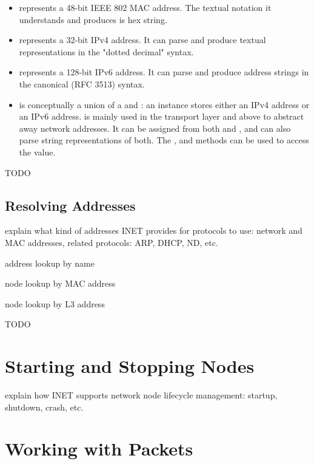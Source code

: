 \begin{itemize}
  \item {} represents a 48-bit IEEE 802 MAC address. The
    textual notation it understands and produces is hex string.

  \item {} represents a 32-bit IPv4 address. It can parse
    and produce textual representations in the "dotted decimal" syntax.

  \item {} represents a 128-bit IPv6 address. It can parse
    and produce address strings in the canonical (RFC 3513) syntax.

  \item {} is conceptually a union of a 
    and : an instance stores either an IPv4 address or an
    IPv6 address.  is mainly used in the transport layer and above
    to abstract away network addresses. It can be assigned from both 
    and , and can also parse string representations of both.
    The ,  and  methods can be used
    to access the value.
\end{itemize}

\ifdraft TODO
\subsection{Resolving Addresses}

explain what kind of addresses INET provides for protocols to use: network
and MAC addresses, related protocols: ARP, DHCP, ND, etc.

address lookup by name

node lookup by MAC address

node lookup by L3 address
\fi

\ifdraft TODO
\section{Starting and Stopping Nodes}

explain how INET supports network node lifecycle management: startup, shutdown, crash, etc.

\fi

\section{Working with Packets}

